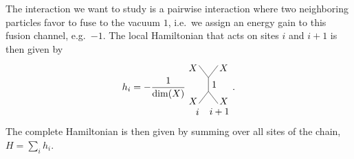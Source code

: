 \documentclass[aps,prb,twocolumn,superscriptaddress,noshowkeys]{revtex4-1}  %
\theoremstyle{plain}%
\theoremstyle{definition}
\theoremstyle{remark}
\begin{document}
The interaction we want to study is a pairwise interaction where two neighboring particles favor to fuse to the vacuum $1$, i.e.\ we assign an energy gain to this fusion channel, e.g.\ $-1$. The local Hamiltonian that acts on sites $i$ and $i+1$ is then given by
\begin{equation}\label{eq:Ham}
h_i=-\frac{1}{\dim(X)}
\begin{tikzpicture}[scale=0.5,baseline=(current bounding box.center)]
\draw[] (0,0) to node [left,pos=0.8] {$X$} (-0.7,0.9);
\draw[] (0,0) to node [right,pos=0.8] {$X$} (0.7,0.9);
\draw (0,0) to node[right] {$1$} (0,-1);
\draw[] (0,-1) to node [left,pos=0.8] {$X$} (-0.7,-1.9);
\draw[] (0,-1) to node [right,pos=0.8] {$X$} (0.7,-1.9);
\node at (0.8,-2.5) {$i+1$};
\node at (-0.8,-2.5) {$i$};
\end{tikzpicture}.
\end{equation}
The complete Hamiltonian is then given by summing over all sites of the chain, $H=\sum_i h_i$.
\end{document}

